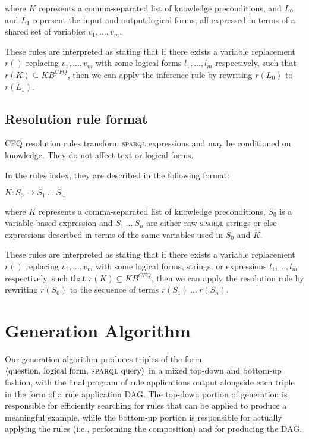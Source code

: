 \documentclass[letterpaper]{article}
\newcommand{\SPARQL}{\textsc{sparql}}
\begin{document}
\noindent where $K$ represents a comma-separated list of knowledge preconditions, and $L_0$ and $L_1$ represent the input and output logical forms, all expressed in terms of a shared set of variables $v_1,...,v_m$.

These rules are interpreted as stating that if there exists a variable replacement $r()$ replacing $v_1,...,v_m$ with some logical forms $l_1,...,l_m$ respectively, such that $r(K) \subseteq KB^{CFQ}$, then we can apply the inference rule by rewriting $r(L_0)$ to $r(L_1)$.

\subsection{Resolution rule format}

CFQ resolution rules transform \SPARQL{} expressions and may be conditioned on knowledge. They do not affect text or logical forms.

In the rules index, they are described in the following format:

\begin{flushleft}
$K: S_0 \rightarrow S_1~...~S_n$
\end{flushleft}

\noindent where $K$ represents a comma-separated list of knowledge preconditions, $S_0$ is a variable-based expression and $S_1~...~S_n$ are either raw \SPARQL{} strings or else expressions described in terms of the same variables used in $S_0$ and $K$.

These rules are interpreted as stating that if there exists a variable replacement $r()$ replacing $v_1,...,v_m$ with some logical forms, strings, or expressions $l_1,...,l_m$ respectively, such that $r(K) \subseteq KB^{CFQ}$, then we can apply the resolution rule by rewriting $r(S_0)$ to the sequence of terms $r(S_1)~...~r(S_n)$.

\section{Generation Algorithm}
\label{suppl:generation-algorithm}

Our generation algorithm produces triples of the form $\langle \text{question, logical form, \SPARQL{} query} \rangle$ in a mixed top-down and bottom-up fashion, with the final program of rule applications output alongside each triple in the form of a rule application DAG. The top-down portion of generation is responsible for efficiently searching for rules that can be applied to produce a meaningful example, while the bottom-up portion is responsible for actually applying the rules (i.e., performing the composition) and for producing the DAG.
\end{document}
